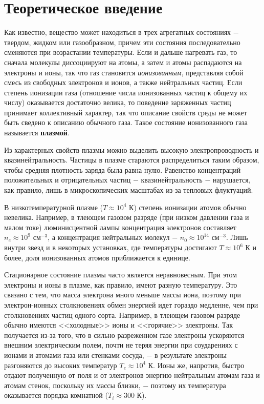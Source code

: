 \documentclass[a4paper,12pt]{article} %
\begin{document}
\section{Теоретическое введение}
\hfill \break Как известно, вещество может находиться в трех агрегатных состояниях $-$ твердом, жидком или газообразном, причем эти состояния последовательно сменяются при возрастании температуры. Если и дальше нагревать газ, то сначала молекулы диссоциируют на атомы, а затем и атомы распадаются на электроны и ионы, так что газ становится \textit{ионизованным}, представляя собой смесь из свободных электронов и ионов, а также нейтральных частиц. Если степень ионизации газа (отношение числа ионизованных частиц к общему их числу) оказывается достаточно велика, то поведение заряженных частиц принимает коллективный характер, так что описание свойств среды не может быть сведено к описанию обычного газа. Такое состояние ионизованного газа называется \textbf{плазмой}.

\hfill \break Из характерных свойств плазмы можно выделить высокую электропроводность и квазинейтральность. Частицы в плазме стараются распределиться таким образом, чтобы средняя плотность заряда была равна нулю. Равенство концентраций положительных и отрицательных частиц $-$ квазинейтральность $-$ нарушается, как правило, лишь в микроскопических масштабах из-за тепловых флуктуаций. 

\hfill \break В низкотемпературной плазме ($T \approx 10^4$ К) степень ионизации атомов обычно невелика. Например, в тлеющем газовом разряде (при низком давлении газа и малом токе) люминисцентной лампы концентрация электронов составляет $n_{e} \approx 10^9 \text{ см}^{-3}$, а концентрация нейтральных молекул $-$ $n_{0} \approx 10^{14} \text{ см}^{-3}$. Лишь внутри звезд и в некоторых установках, где температуры достигают $T \approx 10^6$ К и более, доля ионизованных атомов приближается к единице. 

\hfill \break Стационарное состояние плазмы часто является неравновесным. При этом электроны и ионы в плазме, как правило, имеют разную температуру. Это связано с тем, что масса электрона много меньше массы иона, поэтому при электрон-ионных столкновениях обмен энергией идет гораздо медленне, чем при столкновениях частиц одного сорта. Например, в тлеющем газовом разряде обычно имеются <<холодные>> ионы и <<горячие>> электроны. Так получается из-за того, что в сильно разреженном газе электроны ускоряются внешним электрическим полем, почти не теряя энергии при соударениях с ионами и атомами газа или стенками сосуда, $-$ в результате электроны разгоняются до высоких температур $T_{e} \approx 10^4$ К. Ионы же, напротив, быстро отдают полученную от поля и от электронов энергию нейтральным атомам газа и атомам стенок, поскольку их массы близки, $-$ поэтому их температура оказывается порядка комнатной ($T_{i} \approx 300$ К).
\end{document}

